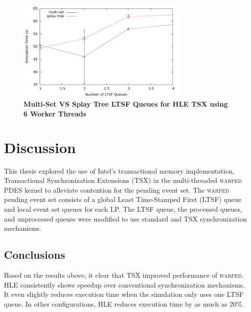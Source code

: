 \documentclass[11pt]{book}
\begin{document}
\begin{figure}[H]
    \centering
    \graphicspath{ {./figures/} }
    \includegraphics[width=0.75\textwidth,keepaspectratio]{hugeepidemicsim-NOmig-timeVSschedQs-msVSst-6thread-hle}
\caption{\textbf{Multi-Set VS Splay Tree LTSF Queues for HLE TSX using 6 Worker
    Threads}}\label{fig:noThrMig_timeVSschq_6threads_msVSst_hle}
\end{figure}


\chapter{Discussion}

This thesis explored the use of Intel's transactional memory implementation,
Transactional Synchronization Extensions (TSX) in the multi-threaded
\textsc{warped} PDES kernel to alleviate contention for the pending event set.
The \textsc{warped} pending event set consists of a global Least Time-Stamped
First (LTSF) queue and local event set queues for each LP.  The LTSF queue, the
processed queues, and unprocessed queues were modified to use standard and TSX
synchronization mechanisms. 

\section{Conclusions}

Based on the results above, it clear that TSX improved performance of
\textsc{warped}.  HLE consistently shows speedup over conventional
synchronization mechanisms.  It even slightly reduces execution time when the
simulation only uses one LTSF queue.  In other configurations, HLE reduces
execution time by as much as 20\%. 
\end{document}

